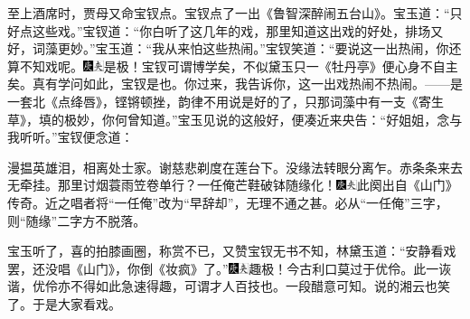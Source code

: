 至上酒席时，贾母又命宝钗点。宝钗点了一出《鲁智深醉闹五台山》。宝玉道：“只好点这些戏。”宝钗道：“你白听了这几年的戏，那里知道这出戏的好处，排场又好，词藻更妙。”宝玉道：“我从来怕这些热闹。”宝钗笑道：“要说这一出热闹，你还算不知戏呢。{\includegraphics[width=3mm]{../Images/00004}\includegraphics[width=3mm]{../Images/00012}\footnotesize \kaishu 是极！宝钗可谓博学矣，不似黛玉只一《牡丹亭》便心身不自主矣。真有学问如此，宝钗是也。}你过来，我告诉你，这一出戏热闹不热闹。------是一套北《点绛唇》，铿锵顿挫，韵律不用说是好的了，只那词藻中有一支《寄生草》，填的极妙，你何曾知道。”宝玉见说的这般好，便凑近来央告：“好姐姐，念与我听听。”宝钗便念道：

漫揾英雄泪，相离处士家。谢慈悲剃度在莲台下。没缘法转眼分离乍。赤条条来去无牵挂。那里讨烟蓑雨笠卷单行？一任俺芒鞋破钵随缘化！{\includegraphics[width=3mm]{../Images/00004}\includegraphics[width=3mm]{../Images/00012}\footnotesize \kaishu 此阕出自《山门》传奇。近之唱者将“一任俺”改为“早辞却”，无理不通之甚。必从“一任俺”三字，则“随缘”二字方不脱落。}

宝玉听了，喜的拍膝画圈，称赏不已，又赞宝钗无书不知，林黛玉道：“安静看戏罢，还没唱《山门》，你倒《妆疯》了。”{\includegraphics[width=3mm]{../Images/00004}\includegraphics[width=3mm]{../Images/00012}\footnotesize \kaishu 趣极！今古利口莫过于优伶。此一诙谐，优伶亦不得如此急速得趣，可谓才人百技也。一段醋意可知。}说的湘云也笑了。于是大家看戏。

